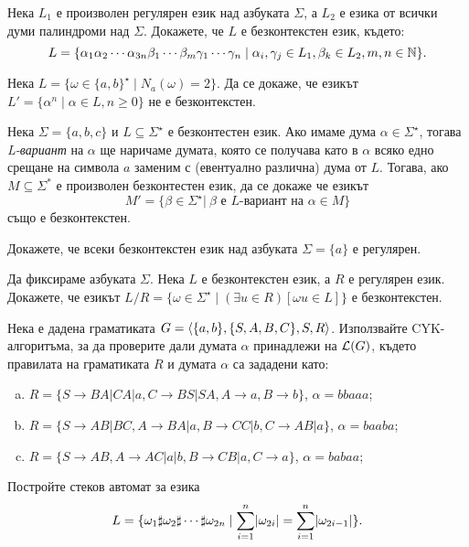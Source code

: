 \begin{problem}
  Нека $L_1$ е произволен регулярен език над азбуката $\Sigma$, 
  а $L_2$ е езика от всички думи палиндроми над $\Sigma$.
  Докажете, че $L$ е безконтекстен език, където:
  \[L = \{\alpha_1\alpha_2\cdots\alpha_{3n}\beta_1\cdots\beta_m\gamma_1\cdots\gamma_n \mid \alpha_i,\gamma_j \in L_1, \beta_k\in L_2, m,n \in \mathbb{N}\}.\]
\end{problem}

\begin{problem}
  Нека $L = \{\omega\in\{a,b\}^\star \mid N_a(\omega) = 2\}$.
  Да се докаже, че езикът $L' = \{\alpha^n \mid \alpha\in L, n \geq 0\}$ не е безконтекстен.
\end{problem}


\begin{problem}
  Нека $\Sigma = \{a,b,c\}$ и $L \subseteq \Sigma^\star$ е безконтестен език. Ако имаме дума 
  $\alpha \in \Sigma^\star$, тогава \emph{L-вариант} на $\alpha$ ще наричаме думата, която се получава като в $\alpha$ всяко едно 
  срещане на символа $a$ заменим с (евентуално различна) дума от $L$.
  Тогава, ако $M \subseteq \Sigma^*$ е произволен безконтестен език, да се докаже че езикът
  \begin{equation*}
    M' = \{\beta\in\Sigma^\star |\ \beta \text{ е $L$-вариант на } \alpha \in M \}
  \end{equation*}
  също е безконтекстен.
\end{problem}

\begin{problem}
  Докажете, че всеки безконтекстен език над азбуката $\Sigma = \{a\}$
  е регулярен.
\end{problem}

\begin{problem}
  Да фиксираме азбуката $\Sigma$.
  Нека $L$ е безконтекстен език, а $R$ е регулярен език.
  Докажете, че езикът
  $L/R = \{\omega \in \Sigma^\star \mid (\exists u \in R)[\omega u \in L]\}$
  е безконтекстен.
\end{problem}


\begin{problem}
  Нека е дадена граматиката $G = \langle{\{a,b\}, \{S,A,B,C\},S,R}\rangle$.
  Използвайте CYK-алгоритъма, за да проверите дали
  думата $\alpha$ принадлежи на $\mathcal{L}(G)$, където правилата на граматиката $R$ и думата $\alpha$
  са зададени като:
  \begin{enumerate}[a)]
  \item
    $R = \{S\rightarrow BA| CA|a, C\rightarrow BS|SA,A\rightarrow a, B\rightarrow b\}$, $\alpha=bbaaa$;
  \item
    $R =\{S\rightarrow AB|BC, A\rightarrow BA|a,B\rightarrow CC|b, C\rightarrow AB|a\}$, $\alpha=baaba$;
  \item
    $R = \{S\rightarrow AB, A\rightarrow AC|a|b,B\rightarrow CB|a, C\rightarrow a\}$, $\alpha=babaa$;
  \end{enumerate}
\end{problem}

\begin{problem}
  Постройте стеков автомат за езика 
  \[L = \{\omega_1 \sharp \omega_2 \sharp \cdots \sharp \omega_{2n} \mid \sum^n_{i=1}\lvert{\omega_{2i}}\rvert = \sum^{n}_{i=1}\lvert{\omega_{2i-1}}\rvert\}.\]
\end{problem}


